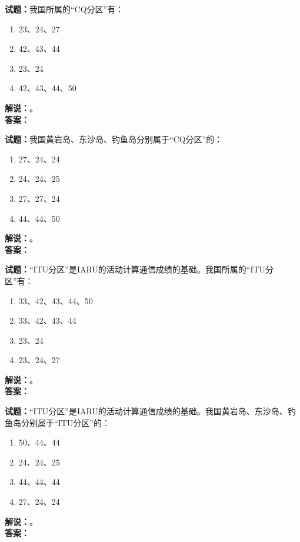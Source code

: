 \documentclass{ctexbook}
\begin{document}
\vspace{\baselineskip}

\noindent\textbf{试题：}我国所属的“CQ分区”有：
\begin{enumerate}[leftmargin=3em]
  \item 23、24、27
  \item 42、43、44
  \item 23、24
  \item 42、43、44、50
\end{enumerate}
\noindent\textbf{解说：}\textbf{}。\\\noindent\textbf{答案：}

\vspace{\baselineskip}

\noindent\textbf{试题：}我国黄岩岛、东沙岛、钓鱼岛分别属于“CQ分区”的：
\begin{enumerate}[leftmargin=3em]
  \item 27、24、24
  \item 24、24、25
  \item 27、27、24
  \item 44、44、50
\end{enumerate}
\noindent\textbf{解说：}\textbf{}。\\\noindent\textbf{答案：}

\vspace{\baselineskip}

\noindent\textbf{试题：}“ITU分区”是IARU的活动计算通信成绩的基础。我国所属的“ITU分区”有：
\begin{enumerate}[leftmargin=3em]
  \item 33、42、43、44、50
  \item 33、42、43、44
  \item 23、24
  \item 23、24、27
\end{enumerate}
\noindent\textbf{解说：}\textbf{}。\\\noindent\textbf{答案：}

\vspace{\baselineskip}

\noindent\textbf{试题：}“ITU分区”是IARU的活动计算通信成绩的基础。我国黄岩岛、东沙岛、钓鱼岛分别属于“ITU分区”的：
\begin{enumerate}[leftmargin=3em]
  \item 50、44、44
  \item 24、24、25
  \item 44、44、44
  \item 27、24、24
\end{enumerate}
\noindent\textbf{解说：}\textbf{}。\\\noindent\textbf{答案：}
\end{document}
